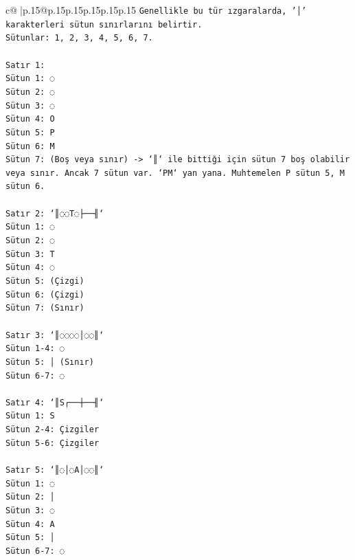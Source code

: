 \documentclass{article}
\begin{document}
{\begin{supertabular}{c@{$\;$}|p{.15\linewidth}@{}p{.15\linewidth}p{.15\linewidth}p{.15\linewidth}p{.15\linewidth}p{.15\linewidth}}
{{{\texttt{Genellikle bu tür ızgaralarda, '│' karakterleri sütun sınırlarını belirtir.} \\
\texttt{Sütunlar: 1, 2, 3, 4, 5, 6, 7.} \\
\\ 
\texttt{Satır 1:} \\
\texttt{Sütun 1: ◌} \\
\texttt{Sütun 2: ◌} \\
\texttt{Sütun 3: ◌} \\
\texttt{Sütun 4: O} \\
\texttt{Sütun 5: P} \\
\texttt{Sütun 6: M} \\
\texttt{Sütun 7: (Boş veya sınır) {-}> `║` ile bittiği için sütun 7 boş olabilir veya sınır. Ancak 7 sütun var. `PM` yan yana. Muhtemelen P sütun 5, M sütun 6.} \\
\\ 
\texttt{Satır 2: `║◌◌T◌├──╢`} \\
\texttt{Sütun 1: ◌} \\
\texttt{Sütun 2: ◌} \\
\texttt{Sütun 3: T} \\
\texttt{Sütun 4: ◌} \\
\texttt{Sütun 5: (Çizgi)} \\
\texttt{Sütun 6: (Çizgi)} \\
\texttt{Sütun 7: (Sınır)} \\
\\ 
\texttt{Satır 3: `║◌◌◌◌│◌◌║`} \\
\texttt{Sütun 1{-}4: ◌} \\
\texttt{Sütun 5: │ (Sınır)} \\
\texttt{Sütun 6{-}7: ◌} \\
\\ 
\texttt{Satır 4: `║S┌──┼──╢`} \\
\texttt{Sütun 1: S} \\
\texttt{Sütun 2{-}4: Çizgiler} \\
\texttt{Sütun 5{-}6: Çizgiler} \\
\\ 
\texttt{Satır 5: `║◌│◌A│◌◌║`} \\
\texttt{Sütun 1: ◌} \\
\texttt{Sütun 2: │} \\
\texttt{Sütun 3: ◌} \\
\texttt{Sütun 4: A} \\
\texttt{Sütun 5: │} \\
\texttt{Sütun 6{-}7: ◌} \\
}}}
\end{supertabular}}
\end{document}
